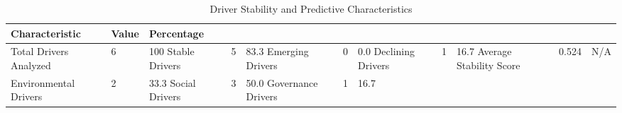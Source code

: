 \begin{table}
\caption{Driver Stability and Predictive Characteristics}
\label{tab:driver_characteristics}
\begin{tabular}{lll}
\toprule
Characteristic & Value & Percentage \\
\midrule
Total Drivers Analyzed & 6 & 100%
Stable Drivers & 5 & 83.3%
Emerging Drivers & 0 & 0.0%
Declining Drivers & 1 & 16.7%
Average Stability Score & 0.524 & N/A \\
Environmental Drivers & 2 & 33.3%
Social Drivers & 3 & 50.0%
Governance Drivers & 1 & 16.7%
\bottomrule
\end{tabular}
\end{table}
